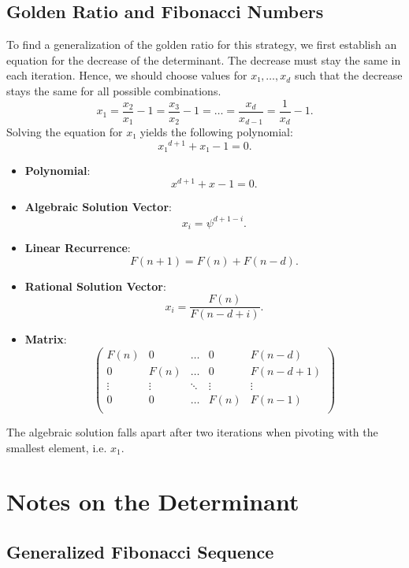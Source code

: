 \documentclass[english,version-2020-11]{uzl-thesis}
\begin{document}
\section{Golden Ratio and Fibonacci Numbers}

To find a generalization of the golden ratio for this strategy,
we first establish an equation for the decrease of the determinant.
The decrease must stay the same in each iteration.
Hence, we should choose values for $x₁, \dots, x_d$ such that the decrease
stays the same for all possible combinations.
\[
  x_1 = \frac{x_2}{x_1} - 1 = \frac{x_3}{x_2} - 1 = \dots = \frac{x_d}{x_{d-1}} = \frac{1}{x_d} - 1.
\]
Solving the equation for $x₁$ yields the following polynomial:
\[
  x₁^{d+1} + x₁ - 1 = 0.
\]

\begin{itemize}
  \item \textbf{Polynomial}: \[x^{d+1} + x - 1 = 0.\]
  \item \textbf{Algebraic Solution Vector}: \[x_i = \psi^{d+1-i}.\]
  \item \textbf{Linear Recurrence}: \[F(n + 1) = F(n) + F(n - d).\]
  \item \textbf{Rational Solution Vector}: \[x_i = \frac{F(n)}{F(n-d+i)}.\]
  \item \textbf{Matrix}:
    \[\left(\begin{array}{cccc|c}
      F(n)   & 0      & \dots  & 0      & F(n - d) \\
        0    & F(n)   & \dots  & 0      & F(n - d + 1) \\
      \vdots & \vdots & \ddots & \vdots & \vdots   \\
        0    & 0      & \dots  & F(n)   & F(n - 1) \\
    \end{array}\right)\]
\end{itemize}

The algebraic solution falls apart after two iterations when pivoting with the
smallest element, i.e. $x_1$.


\chapter{Notes on the Determinant}


\section{Generalized Fibonacci Sequence}
\end{document}
